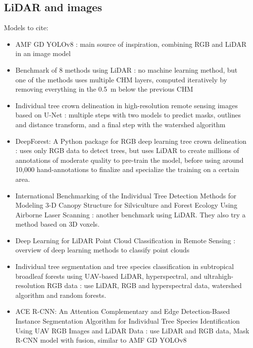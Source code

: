 \documentclass[
]{report}
\providecommand{\tightlist}{%
  \setlength{\itemsep}{0pt}\setlength{\parskip}{0pt}}\usepackage{longtable,booktabs,array}
\begin{document}
\subsection{LiDAR and images}\label{lidar-and-images}

Models to cite:

\begin{itemize}
\tightlist
\item
  AMF GD YOLOv8 \autocite{amf_gd_yolov8}: main source of inspiration,
  combining RGB and LiDAR in an image model
\item
  Benchmark of 8 methods using LiDAR \autocite{lidar_benchmark}: no
  machine learning method, but one of the methods uses multiple CHM
  layers, computed iteratively by removing everything in the 0.5~m below
  the previous CHM
\item
  Individual tree crown delineation in high-resolution remote sensing
  images based on U-Net \autocite{Freudenberg2022}: multiple steps with
  two models to predict masks, outlines and distance transform, and a
  final step with the watershed algorithm
\item
  DeepForest: A Python package for RGB deep learning tree crown
  delineation \autocite{DeepForest}: uses only RGB data to detect trees,
  but uses LiDAR to create millions of annotations of moderate quality
  to pre-train the model, before using around 10,000 hand-annotations to
  finalize and specialize the training on a certain area.
\item
  International Benchmarking of the Individual Tree Detection Methods
  for Modeling 3-D Canopy Structure for Silviculture and Forest Ecology
  Using Airborne Laser Scanning \autocite{lidar_benchmark_2}: another
  benchmark using LiDAR. They also try a method based on 3D voxels.
\item
  Deep Learning for LiDAR Point Cloud Classification in Remote Sensing
  \autocite{lidar_classification}: overview of deep learning methods to
  classify point clouds
\item
  Individual tree segmentation and tree species classification in
  subtropical broadleaf forests using UAV-based LiDAR, hyperspectral,
  and ultrahigh-resolution RGB data \autocite{lidar_rgb_wst}: use LiDAR,
  RGB and hyperspectral data, watershed algorithm and random forests.
\item
  ACE R-CNN: An Attention Complementary and Edge Detection-Based
  Instance Segmentation Algorithm for Individual Tree Species
  Identification Using UAV RGB Images and LiDAR Data
  \autocite{lidar_rgb_acnet}: use LiDAR and RGB data, Mask R-CNN model
  with fusion, similar to AMF GD YOLOv8
\end{itemize}
\end{document}
